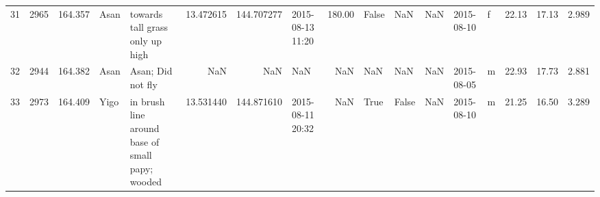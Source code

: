 \begin{tabular}{lrrllrrlrlllllrrr}
31 &       2965 &    164.357 &     Asan &                                                        towards tall grass only up high &  13.472615 &  144.707277 &     2015-08-13 11:20 &                  180.00 &             False &     NaN &           NaN &       2015-08-10 &   f &   22.13 &  17.13 &   2.989 \\
32 &       2944 &    164.382 &     Asan &                                                                      Asan; Did not fly &        NaN &         NaN &                  NaN &                     NaN &               NaN &     NaN &           NaN &       2015-08-05 &   m &   22.93 &  17.73 &   2.881 \\
33 &       2973 &    164.409 &     Yigo &                                        in brush line around base of small papy; wooded &  13.531440 &  144.871610 &     2015-08-11 20:32 &                     NaN &              True &   False &           NaN &       2015-08-10 &   m &   21.25 &  16.50 &   3.289 \\
\bottomrule
\end{tabular}
